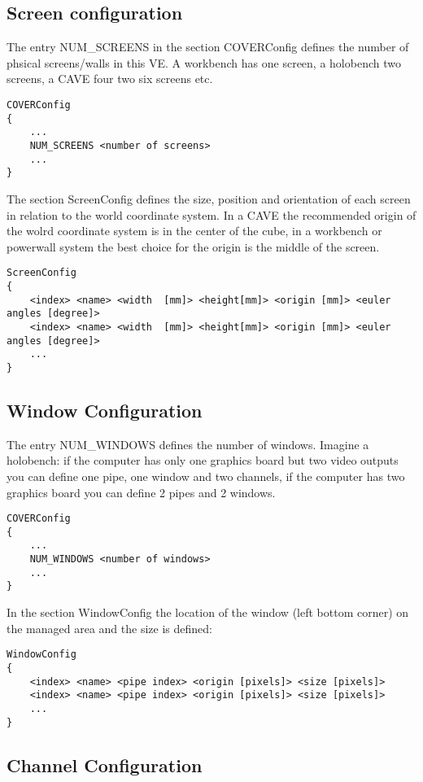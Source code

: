\subsection{Screen configuration}
 
The entry NUM\_SCREENS in the section COVERConfig defines the number of 
phsical screens/walls in this VE. A workbench has one screen, a holobench 
two screens, a CAVE four two six screens etc.
\small
\begin{verbatim}
COVERConfig
{	
    ...
    NUM_SCREENS	<number of screens>
    ...
}
\end{verbatim}
\normalsize
The section ScreenConfig defines the size, position and orientation
of each screen in relation to the world coordinate system. In a CAVE
the recommended origin of the wolrd coordinate system is in the
center of the cube, in a workbench or powerwall system the best choice
for the origin is the middle of the screen.
\small
\begin{verbatim}
ScreenConfig
{
    <index> <name> <width  [mm]> <height[mm]> <origin [mm]> <euler angles [degree]>
    <index> <name> <width  [mm]> <height[mm]> <origin [mm]> <euler angles [degree]>
    ...
}
\end{verbatim}
\normalsize
\subsection{Window Configuration}

The entry NUM\_WINDOWS defines the number of windows. Imagine a 
holobench: if the computer has only one graphics board but two video
outputs you can define one pipe, one window and two channels, if the computer
has two graphics board you can define 2 pipes and 2 windows.
\small
\begin{verbatim}
COVERConfig
{
    ...
    NUM_WINDOWS	<number of windows>
    ...
}
\end{verbatim}
\normalsize
In the section WindowConfig the location of the window (left bottom corner) 
on the managed area and the size is defined:

\small \begin{verbatim}
WindowConfig
{
    <index> <name> <pipe index> <origin [pixels]> <size [pixels]>
    <index> <name> <pipe index> <origin [pixels]> <size [pixels]>
    ...
}
\end{verbatim} \normalsize


\subsection{Channel Configuration}

